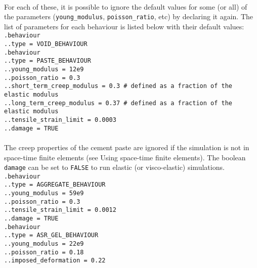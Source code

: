 \documentclass[10pt]{article}
\begin{document}
\paragraph{}For each of these, it is possible to ignore the default values for some (or all) of the parameters (\verb+young_modulus+, \verb+poisson_ratio+, etc) by declaring it again. The list of parameters for each behaviour is listed below with their default values:\\

\noindent \verb+.behaviour+\\
\verb+..type = VOID_BEHAVIOUR+\\

\noindent \verb+.behaviour+\\
\verb+..type = PASTE_BEHAVIOUR+\\
\verb+..young_modulus = 12e9+\\
\verb+..poisson_ratio = 0.3+\\
\verb+..short_term_creep_modulus = 0.3 # defined as a fraction of the elastic modulus+\\
\verb+..long_term_creep_modulus = 0.37 # defined as a fraction of the elastic modulus+\\
\verb+..tensile_strain_limit = 0.0003+\\
\verb+..damage = TRUE+

\paragraph{} The creep properties of the cement paste are ignored if the simulation is not in space-time finite elements (see Using space-time finite elements). The boolean \verb+damage+ can be set to \verb+FALSE+ to run elastic (or visco-elastic) simulations.\\

\noindent \verb+.behaviour+\\
\verb+..type = AGGREGATE_BEHAVIOUR+\\
\verb+..young_modulus = 59e9+\\
\verb+..poisson_ratio = 0.3+\\
\verb+..tensile_strain_limit = 0.0012+\\
\verb+..damage = TRUE+\\

\noindent \verb+.behaviour+\\
\verb+..type = ASR_GEL_BEHAVIOUR+\\
\verb+..young_modulus = 22e9+\\
\verb+..poisson_ratio = 0.18+\\
\verb+..imposed_deformation = 0.22+\\
\end{document}
